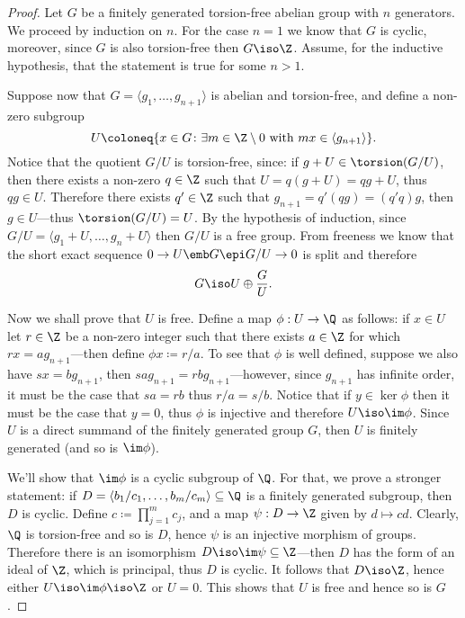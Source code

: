 \begin{proof}
    Let \(G\) be a finitely generated torsion-free abelian group with \(n\)
    generators. We proceed by induction on \(n\). For the case \(n = 1\) we know
    that \(G\) is cyclic, moreover, since \(G\) is also torsion-free then
    \(G \iso \Z\). Assume, for the inductive hypothesis, that the statement is true
    for some \(n > 1\).

    Suppose now that \(G = \langle g_1, \dots, g_{n+1} \rangle\) is abelian and
    torsion-free, and define a non-zero subgroup
    \[
        U \coloneq
        \{x \in G \colon \exists m \in \Z \setminus 0
        \text{ with } m x \in \langle g_{n+1} \rangle\}.
    \]
    Notice that the quotient \(G/U\) is torsion-free, since: if
    \(g + U \in \torsion(G/U)\), then there exists a non-zero \(q \in \Z\) such that
    \(U = q(g + U) = q g + U\), thus \(q g \in U\). Therefore there exists
    \(q' \in \Z\) such that \(g_{n+1} = q'(q g) = (q' q) g\), then
    \(g \in U\)---thus \(\torsion(G/U) = U\). By the hypothesis of induction, since
    \(G/U = \langle g_1 + U, \dots, g_n + U \rangle\) then \(G/U\) is a free
    group. From freeness we know that the short exact sequence
    \(0 \to U \emb G \epi G/U \to 0\) is split and therefore
    \[
        G \iso U \oplus \frac{G}{U}.
    \]

    Now we shall prove that \(U\) is free. Define a map \(\phi: U \to \Q\) as
    follows: if \(x \in U\) let \(r \in \Z\) be a non-zero
    integer such that there exists \(a \in \Z\) for which \(r x = a g_{n+1}\)---then
    define \(\phi x \coloneq r/a\). To see that \(\phi\) is well defined, suppose we
    also have \(s x = b g_{n + 1}\), then \(s a g_{n+1} = r b g_{n+1}\)---however,
    since \(g_{n+1}\) has infinite order, it must be the case that \(s a = r b\)
    thus \(r/a = s/b\). Notice that if \(y \in \ker \phi\) then it must be the case
    that \(y = 0\), thus \(\phi\) is injective and therefore \(U \iso \im
    \phi\). Since \(U\) is a direct summand of the finitely generated group \(G\),
    then \(U\) is finitely generated (and so is \(\im \phi\)).

    We'll show that \(\im \phi\) is a cyclic subgroup of \(\Q\). For that, we prove
    a stronger statement: if
    \(D = \langle b_1/c_1, \dots, b_m/c_m \rangle \subseteq \Q\) is a finitely
    generated subgroup, then \(D\) is cyclic. Define
    \(c \coloneq \prod_{j=1}^m c_j\), and a map \(\psi: D \to \Z\) given by
    \(d \mapsto c d\). Clearly, \(\Q\) is torsion-free and so is \(D\), hence
    \(\psi\) is an injective morphism of groups. Therefore there is an isomorphism
    \(D \iso \im \psi \subseteq \Z\)---then \(D\) has the form of an ideal of
    \(\Z\), which is principal, thus \(D\) is cyclic. It follows that \(D \iso \Z\),
    hence either \(U \iso \im \phi \iso \Z\) or \(U = 0\). This shows that \(U\) is
    free and hence so is \(G\).
\end{proof}


